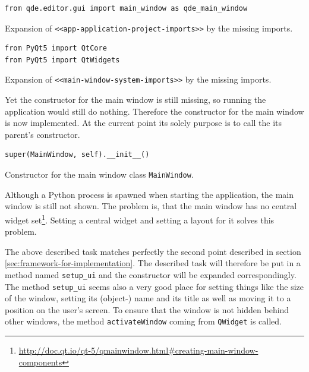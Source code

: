 \documentclass[10pt, openright, notitlepage]{scrreprt}
\begin{document}
\begin{listing}[H]
\begin{verbatim}
from qde.editor.gui import main_window as qde_main_window
\end{verbatim}
\caption{\label{app-application-project-imports}
Expansion of \texttt{<<app-application-project-imports>>} by the missing imports.}
\end{listing}

\begin{listing}[H]
\begin{verbatim}
from PyQt5 import QtCore
from PyQt5 import QtWidgets
\end{verbatim}
\caption{\label{main-window-system-imports}
Expansion of \texttt{<<main-window-system-imports>>} by the missing imports.}
\end{listing}

Yet the constructor for the main window is still missing, so running the
application would still do nothing. Therefore the constructor for the main
window is now implemented. At the current point its solely purpose is to call
the its parent's constructor.

\begin{listing}[H]
\begin{verbatim}
super(MainWindow, self).__init__()
\end{verbatim}
\caption{\label{main-window-constructor}
Constructor for the main window class \texttt{MainWindow}.}
\end{listing}

Although a Python process is spawned when starting the application, the main
window is still not shown. The problem is, that the main window has no central
widget
set\footnote{\url{http://doc.qt.io/qt-5/qmainwindow.html\#creating-main-window-components}}.
Setting a central widget and setting a layout for it solves this problem.

The above described task matches perfectly the second point described in section
\ref{sec:framework-for-implementation}. The described task will therefore be put in a
method named \texttt{setup\_ui} and the constructor will be expanded correspondingly.
The method \texttt{setup\_ui} seems also a very good place for setting things like the
size of the window, setting its (object-) name and its title as well as moving
it to a position on the user's screen. To ensure that the window is not hidden
behind other windows, the method \texttt{activateWindow} coming from \texttt{QWidget} is
called.
\end{document}
